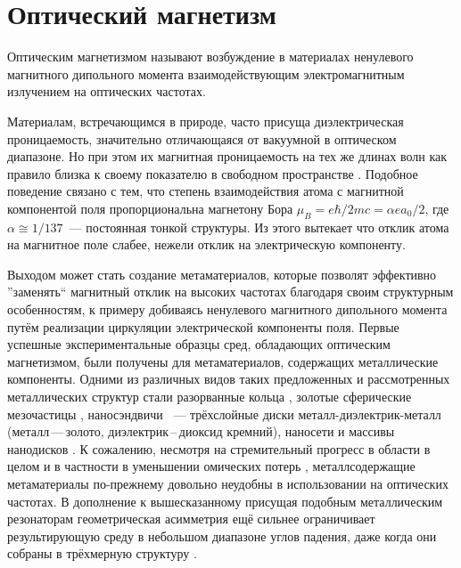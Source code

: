 \section{Оптический магнетизм}

Оптическим магнетизмом называют возбуждение в материалах ненулевого магнитного дипольного момента взаимодействующим электромагнитным излучением на оптических частотах.

Материалам, встречающимся в природе, часто присуща диэлектрическая проницаемость, значительно отличающаяся от вакуумной в оптическом диапазоне. Но при этом их магнитная проницаемость на тех же длинах волн как правило близка к своему показателю в свободном пространстве \cite{Shalaev2007}. Подобное поведение связано с тем, что степень взаимодействия атома с магнитной компонентой поля пропорциональна магнетону Бора $\mu_B = e \hbar/2 mc = \alpha e a_0 /2$, где $\alpha \cong 1/137$~--- постоянная тонкой структуры. Из этого вытекает что отклик атома на магнитное поле слабее, нежели отклик на электрическую компоненту.

Выходом может стать создание метаматериалов, которые позволят эффективно ''заменять`` магнитный отклик на высоких частотах благодаря своим структурным особенностям, к примеру добиваясь ненулевого магнитного дипольного момента путём реализации циркуляции электрической компоненты поля. Первые успешные экспериментальные образцы сред, обладающих оптическим магнетизмом, были получены для метаматериалов, содержащих металлические компоненты. Одними из различных видов таких предложенных и рассмотренных металлических структур стали разорванные кольца \cite{Enkrich2005, Klein2006}, золотые сферические мезочастицы \cite{Evlyukhin2012}, наносэндвичи \cite{Pakizeh2006}~--- трёхслойные диски металл-диэлектрик-металл (металл\,---\,золото, диэлектрик\,--\,диоксид кремний), наносети \cite{Reinhold2012} и массивы нанодисков \cite{Gantzounis2008}. К сожалению, несмотря на стремительный прогресс в области в целом и в частности в уменьшении омических потерь \cite{Xiao2010}, металлсодержащие метаматериалы по-прежнему довольно неудобны в использовании на оптических частотах. В дополнение к вышесказанному присущая подобным металлическим резонаторам геометрическая асимметрия ещё сильнее ограничивает результирующую среду в небольшом диапазоне углов падения, даже когда они собраны в трёхмерную структуру \cite{Burckel2010}.

